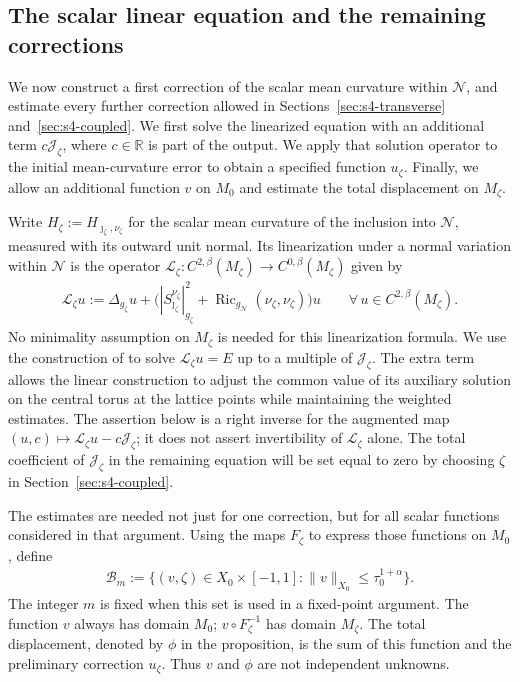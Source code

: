 \documentclass[a4paper,11pt,oneside,reqno]{amsart}
\numberwithin{equation}{section}
\theoremstyle{definition}
\begin{document}
\subsection{The scalar linear equation and the remaining corrections}

We now construct a first correction of the scalar mean
curvature within $\mathcal N$, and estimate every further
correction allowed in Sections~\ref{sec:s4-transverse}
and~\ref{sec:s4-coupled}. We first solve the linearized
equation with an additional term $c\mathcal J_\zeta$, where
$c\in\mathbb R$ is part of the output. We apply that solution
operator to the initial mean-curvature error to obtain a
specified function $u_\zeta$. Finally, we allow an additional
function $v$ on $M_0$ and estimate the total displacement
on $M_\zeta$.

Write $H_\zeta:=H_{\jmath_\zeta,\nu_\zeta}$ for the scalar
mean curvature of the inclusion into $\mathcal N$, measured
with its outward unit normal. Its linearization under a normal
variation within $\mathcal N$ is the operator
$\mathcal L_\zeta:C^{2,\beta}(M_\zeta)\to C^{0,\beta}(M_\zeta)$
given by
%
\begin{align}
    \label{eq:s4-L-zeta}
    \mathcal L_\zeta u
    :=\Delta_{g_\zeta}u+
       \bigl(|S_{\jmath_\zeta}^{\nu_\zeta}|_{g_\zeta}^2
       +\operatorname{Ric}_{g_{\mathcal N}}
                         (\nu_\zeta,\nu_\zeta)\bigr)u
    \qquad\forall\,u\in C^{2,\beta}(M_\zeta).
\end{align}
%
No minimality assumption on $M_\zeta$ is needed for this
linearization formula. We use the construction of
\cite{KapouleasMcGrathLD} to solve
$\mathcal L_\zeta u=E$ up to a multiple of
$\mathcal J_\zeta$. The extra term allows the linear construction
to adjust the common value of its auxiliary solution on the
central torus at the lattice points while maintaining the
weighted estimates. The assertion below is
a right inverse for the augmented map
$(u,c)\mapsto\mathcal L_\zeta u-c\mathcal J_\zeta$;
it does not assert invertibility of $\mathcal L_\zeta$ alone.
The total coefficient of $\mathcal J_\zeta$ in the remaining
equation will be set equal to zero by choosing $\zeta$ in
Section~\ref{sec:s4-coupled}.

The estimates are needed not just for one correction, but for
all scalar functions considered in that argument. Using the
maps $F_\zeta$ to express those functions on $M_0$, define
%
\begin{align}
    \label{eq:s4-scalar-ball}
    \mathcal B_m:=\{(v,\zeta)\in X_0\times[-1,1]:
                         \|v\|_{X_0}\leq\tau_0^{1+\alpha}\}.
\end{align}
%
The integer $m$ is fixed when this set is used in a fixed-point
argument. The function $v$ always has domain $M_0$;
$v\circ F_\zeta^{-1}$ has domain $M_\zeta$.
The total displacement, denoted by $\phi$ in the proposition,
is the sum of this function and the preliminary correction
$u_\zeta$. Thus $v$ and $\phi$ are not independent unknowns.
\end{document}
